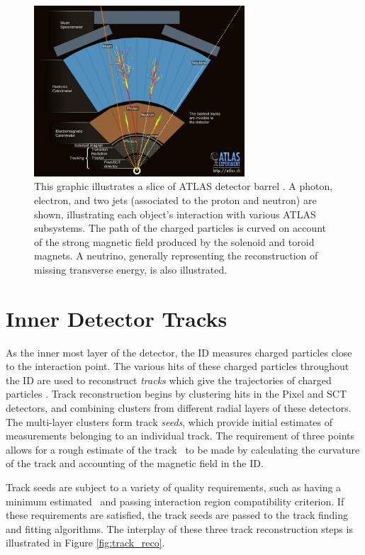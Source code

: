 \begin{figure}
        \centering
	\includegraphics[width=0.7\textwidth]{figures/ch5/detector_objects}
	\caption{This graphic illustrates a slice of ATLAS detector barrel \cite{detector_events}. A photon, electron, and two jets (associated to the proton and neutron) are shown, illustrating each object's interaction with various ATLAS subsystems. The path of the charged particles is curved on account of the strong magnetic field produced by the solenoid and toroid magnets. A neutrino, generally representing the reconstruction of missing transverse energy, is also illustrated.}
	\label{fig:detector_objects}
\end{figure}

\section{Inner Detector Tracks}
\label{sec:inner_det_tracks}
As the inner most layer of the detector, the ID measures charged particles close to the interaction point. The various hits of these charged particles throughout the ID are used to reconstruct \textit{tracks} which give the trajectories of charged particles \cite{track_finding}. Track reconstruction begins by clustering hits in the Pixel and SCT detectors, and combining clusters from different radial layers of these detectors. The multi-layer clusters form track \textit{seeds}, which provide initial estimates of measurements belonging to an individual track. The requirement of three points allows for a rough estimate of the track \pt~to be made by calculating the curvature of the track and accounting of the magnetic field in the ID. \par

Track seeds are subject to a variety of quality requirements, such as having a minimum estimated \pt~and passing interaction region compatibility criterion. If these requirements are satisfied, the track seeds are passed to the track finding and fitting algorithms. The interplay of these three track reconstruction steps is illustrated in Figure \ref{fig:track_reco}. 

